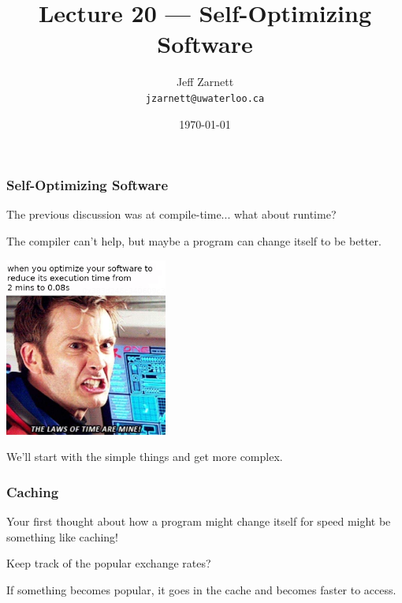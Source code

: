 


\title{Lecture 20 --- Self-Optimizing Software }

\author{Jeff Zarnett \\ \small \texttt{jzarnett@uwaterloo.ca}}
\date{\today}




\begin{frame}
  \titlepage

\end{frame}


\begin{frame}
\frametitle{Self-Optimizing Software}
The previous discussion was at compile-time... what about runtime?

The compiler can't help, but maybe a program can change itself to be better.

\begin{center}
	\includegraphics[width=0.4\textwidth]{images/lawsoftime.png}
\end{center}

We'll start with the simple things and get more complex.
\end{frame}


\begin{frame}
\frametitle{Caching}

Your first thought about how a program might change itself for speed might be something like caching!

Keep track of the popular exchange rates?

If something becomes popular, it goes in the cache and becomes faster to access.

\end{frame}

